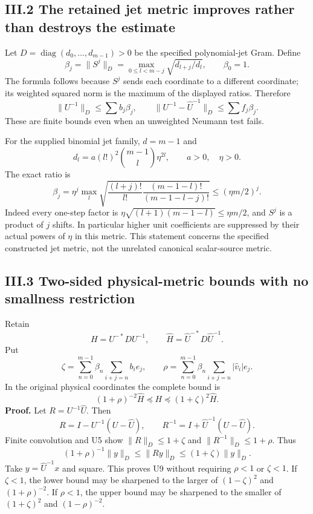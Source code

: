 \subsection{III.2 The retained jet metric improves rather than destroys the estimate}\label{iii.2-the-retained-jet-metric-improves-rather-than-destroys-the-estimate}

Let \(D=\operatorname{diag}(d_0,\ldots,d_{m-1})>0\) be the specified polynomial-jet Gram. Define \[
 \beta_j=\|S^j\|_D
 =\max_{0\le l<m-j}\sqrt{d_{l+j}/d_l},\qquad \beta_0=1.
 \tag{U5}
\] The formula follows because \(S^j\) sends each coordinate to a different coordinate; its weighted squared norm is the maximum of the displayed ratios. Therefore \[
 \|U^{-1}\|_D\le\sum b_j\beta_j,\qquad
 \|U^{-1}-\widehat U^{-1}\|_D\le\sum f_j\beta_j.
 \tag{U6}
\] These are finite bounds even when an unweighted Neumann test fails.

For the supplied binomial jet family, \(d=m-1\) and \[
 d_l=a(l!)^2\binom{m-1}{l}\eta^{2l},\qquad a>0,\quad\eta>0.
\] The exact ratio is \[
 \boxed{\beta_j=\eta^j\max_l
 \sqrt{\frac{(l+j)!}{l!}\frac{(m-1-l)!}{(m-1-l-j)!}}
 \le(\eta m/2)^j.}
 \tag{U7}
\] Indeed every one-step factor is \(\eta\sqrt{(l+1)(m-1-l)}\le\eta m/2\), and \(S^j\) is a product of \(j\) shifts. In particular higher unit coefficients are suppressed by their actual powers of \(\eta\) in this metric. This statement concerns the specified constructed jet metric, not the unrelated canonical scalar-source metric.

\subsection{III.3 Two-sided physical-metric bounds with no smallness restriction}\label{iii.3-two-sided-physical-metric-bounds-with-no-smallness-restriction}

Retain \[
 H=U^{-*}DU^{-1},\qquad
 \widehat H=\widehat U^{-*}D\widehat U^{-1}.
\] Put \[
 \zeta=\sum_{n=0}^{m-1}\beta_n\sum_{i+j=n}b_i e_j,
 \qquad
 \rho=\sum_{n=0}^{m-1}\beta_n\sum_{i+j=n}|\widehat v_i|e_j.
 \tag{U8}
\] In the original physical coordinates the complete bound is \[
 \boxed{(1+\rho)^{-2}\widehat H
 \preceq H\preceq(1+\zeta)^2\widehat H.}
 \tag{U9}
\] \textbf{Proof.} Let \(R=U^{-1}\widehat U\). Then \[
 R=I-U^{-1}(U-\widehat U),\qquad
 R^{-1}=I+\widehat U^{-1}(U-\widehat U).
\] Finite convolution and U5 show \(\|R\|_D\le1+\zeta\) and \(\|R^{-1}\|_D\le1+\rho\). Thus \[
 (1+\rho)^{-1}\|y\|_D\le\|Ry\|_D\le(1+\zeta)\|y\|_D.
\] Take \(y=\widehat U^{-1}x\) and square. This proves U9 without requiring \(\rho<1\) or \(\zeta<1\). If \(\zeta<1\), the lower bound may be sharpened to the larger of \((1-\zeta)^2\) and \((1+\rho)^{-2}\). If \(\rho<1\), the upper bound may be sharpened to the smaller of \((1+\zeta)^2\) and \((1-\rho)^{-2}\).

